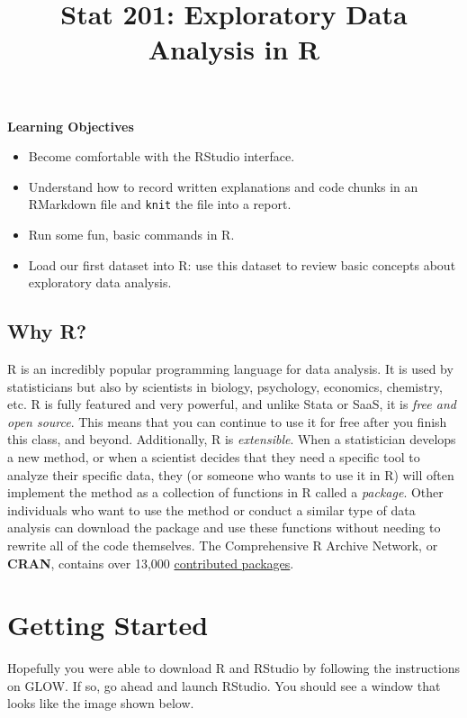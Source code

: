 \documentclass[
]{article}
\title{Stat 201: Exploratory Data Analysis in R}
\author{}
\date{\vspace{-2.5em}}
\providecommand{\tightlist}{%
  \setlength{\itemsep}{0pt}\setlength{\parskip}{0pt}}
\begin{document}
\maketitle

{
\setcounter{tocdepth}{2}
\tableofcontents
}
\label{boxedtext}
\textbf{Learning Objectives}

\begin{itemize}
\tightlist
\item
  Become comfortable with the RStudio interface.
\item
  Understand how to record written explanations and code chunks in an
  RMarkdown file and \texttt{knit} the file into a report.
\item
  Run some fun, basic commands in R.
\item
  Load our first dataset into R: use this dataset to review basic
  concepts about exploratory data analysis.
\end{itemize}

\subsection{Why R?}\label{why-r}

R is an incredibly popular programming language for data analysis. It is
used by statisticians but also by scientists in biology, psychology,
economics, chemistry, etc. R is fully featured and very powerful, and
unlike Stata or SaaS, it is \emph{free and open source}. This means that
you can continue to use it for free after you finish this class, and
beyond. Additionally, R is \emph{extensible}. When a statistician
develops a new method, or when a scientist decides that they need a
specific tool to analyze their specific data, they (or someone who wants
to use it in R) will often implement the method as a collection of
functions in R called a \emph{package}. Other individuals who want to
use the method or conduct a similar type of data analysis can download
the package and use these functions without needing to rewrite all of
the code themselves. The Comprehensive R Archive Network, or
\textbf{CRAN}, contains over 13,000
\href{https://cran.r-project.org/web/packages/}{contributed packages}.

\section{Getting Started}\label{getting-started}

Hopefully you were able to download R and RStudio by following the
instructions on GLOW. If so, go ahead and launch RStudio. You should see
a window that looks like the image shown below.
\end{document}

